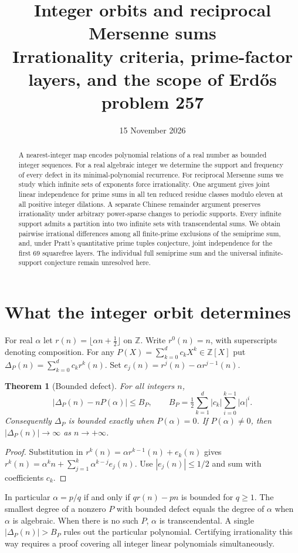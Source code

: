 \documentclass[11pt,letterpaper]{article}
\title{\textbf{Integer orbits and reciprocal Mersenne sums}\\[4pt]
\large Irrationality criteria, prime-factor layers, and the scope of Erd\H{o}s problem 257}
\author{}
\date{15 November 2026}
\newtheorem{theorem}{Theorem}[section]
\newcommand{\Z}{\mathbb Z}
\begin{document}
\maketitle
\begin{abstract}
A nearest-integer map encodes polynomial relations of a real number as bounded integer sequences. For a real algebraic integer we determine the support and frequency of every defect in its minimal-polynomial recurrence. For reciprocal Mersenne sums we study which infinite sets of exponents force irrationality. One argument gives joint linear independence for prime sums in all ten reduced residue classes modulo eleven at all positive integer dilations. A separate Chinese remainder argument preserves irrationality under arbitrary power-sparse changes to periodic supports. Every infinite support admits a partition into two infinite sets with transcendental sums. We obtain pairwise irrational differences among all finite-prime exclusions of the semiprime sum, and, under Pratt's quantitative prime tuples conjecture, joint independence for the first 69 squarefree layers. The individual full semiprime sum and the universal infinite-support conjecture remain unresolved here.
\end{abstract}
\tableofcontents
\newpage
\section{What the integer orbit determines}
For real $\alpha$ let $r(n)=\lfloor\alpha n+\tfrac12\rfloor$ on $\Z$.
Write $r^0(n)=n$, with superscripts denoting composition. For any
$P(X)=\sum_{k=0}^dc_kX^k\in\Z[X]$ put
$\Delta_P(n)=\sum_{k=0}^dc_kr^k(n)$. Set $e_j(n)=r^j(n)-\alpha r^{j-1}(n)$.

\begin{theorem}[Bounded defect]\label{orbitbound}
For all integers $n$,
\[
 |\Delta_P(n)-nP(\alpha)|\le B_P,\qquad
 B_P=\tfrac12\sum_{k=1}^d|c_k|\sum_{i=0}^{k-1}|\alpha|^i.
\]
Consequently $\Delta_P$ is bounded exactly when $P(\alpha)=0$.
If $P(\alpha)\ne0$, then $|\Delta_P(n)|\to\infty$ as $n\to+\infty$.
\end{theorem}
\begin{proof}
Substitution in $r^k(n)=\alpha r^{k-1}(n)+e_k(n)$ gives
$r^k(n)=\alpha^kn+\sum_{j=1}^k\alpha^{k-j}e_j(n)$.
Use $|e_j(n)|\le1/2$ and sum with coefficients $c_k$.
\end{proof}
In particular $\alpha=p/q$ if and only if $qr(n)-pn$ is bounded for
$q\ge1$. The smallest degree of a nonzero $P$ with bounded defect equals
the degree of $\alpha$ when $\alpha$ is algebraic. When there is no such
$P$, $\alpha$ is transcendental. A single $|\Delta_P(n)|>B_P$ rules out
the particular polynomial. Certifying irrationality this way requires
a proof covering all integer linear polynomials simultaneously.
\end{document}
